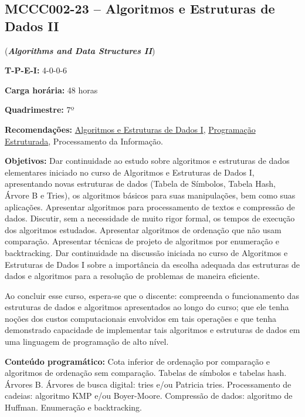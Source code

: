 \documentclass[class=article, crop=false]{standalone}
\begin{document}
\subsection*{MCCC002-23 -- Algoritmos e Estruturas de Dados II}
\label{disc:aedII}

(\textbf{\textit{Algorithms and Data Structures II}})

\begin{center}
    \begin{minipage}{0.85\textwidth}
        \textbf{T-P-E-I:} 4-0-0-6
        
        \textbf{Carga horária:} 48 horas
        
        \textbf{Quadrimestre:} 7º
        
        \textbf{Recomendações:} 
        \hyperref[disc:aedI]{Algoritmos e Estruturas de Dados I},
        \hyperref[disc:pe]{Programação Estruturada},
        Processamento da Informação.
    \end{minipage}
\end{center}

\textbf{Objetivos:}
Dar continuidade ao estudo sobre algoritmos e estruturas de dados elementares
iniciado no curso de Algoritmos e Estruturas de Dados I, apresentando novas 
estruturas de dados (Tabela de Símbolos, Tabela Hash, Árvore B e Tries), os 
algoritmos básicos para suas manipulações, bem como suas aplicações. 
Apresentar algoritmos para processamento de textos e compressão de dados. 
Discutir, sem a necessidade de muito rigor formal, os tempos de execução dos 
algoritmos estudados.
Apresentar algoritmos de ordenação que não usam comparação.
Apresentar técnicas de projeto de algoritmos por enumeração e backtracking.
Dar continuidade na discussão iniciada no curso de Algoritmos e Estruturas 
de Dados I sobre a importância da escolha adequada das estruturas de dados e
algoritmos para a resolução de problemas de maneira eficiente.

Ao concluir esse curso, espera-se que o discente: compreenda o funcionamento
das estruturas de dados e algoritmos apresentados ao longo do curso; que ele
tenha noções dos custos computacionais envolvidos em tais operações e que tenha
demonstrado capacidade de implementar tais algoritmos e estruturas de dados em
uma linguagem de programação de alto nível.

\textbf{Conteúdo programático:}
Cota inferior de ordenação por comparação e algoritmos de ordenação sem comparação.
Tabelas de símbolos e tabelas hash.
Árvores B.
Árvores de busca digital: tries e/ou Patricia tries.
Processamento de cadeias: algoritmo KMP e/ou Boyer-Moore.
Compressão de dados: algoritmo de Huffman.
Enumeração e backtracking.
\end{document}
